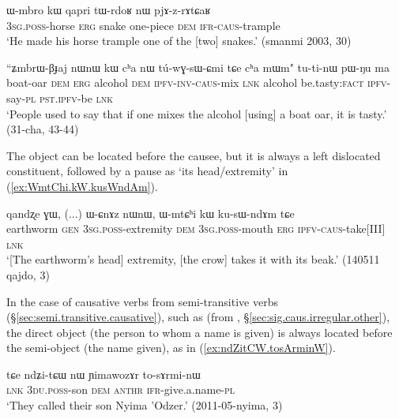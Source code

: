 \begin{exe}
\ex \label{ex:Wmbro.kW.pjAzrAtCaR}
\gll ɯ-mbro kɯ qapri tɯ-rdoʁ nɯ pjɤ-z-rɤtɕaʁ \\
\textsc{3sg}.\textsc{poss}-horse \textsc{erg} snake one-piece \textsc{dem} \textsc{ifr}-\textsc{caus}-trample \\
\glt `He made his horse trample one of the [two] snakes.' (smanmi 2003, 30)
\end{exe}

\begin{exe}
\ex \label{ex:ZmbrWBJaj.kW.tuwGsWCmi}
\gll ``ʑmbrɯ-βɟaj nɯnɯ kɯ cʰa nɯ tú-wɣ-sɯ-ɕmi tɕe cʰa mɯm" tu-ti-nɯ pɯ-ŋu ma \\
boat-oar \textsc{dem} \textsc{erg} alcohol \textsc{dem} \textsc{ipfv}-\textsc{inv}-\textsc{caus}-mix \textsc{lnk} alcohol be.tasty:\textsc{fact} \textsc{ipfv}-say-\textsc{pl} \textsc{pst}.\textsc{ipfv}-be \textsc{lnk} \\
\glt `People used to say that if one mixes the alcohol [using] a boat oar, it is tasty.' (31-cha, 43-44)
\end{exe}

The object can be located before the causee, but it is always a left dislocated constituent, followed by a pause as  `its head/extremity' in (\ref{ex:WmtChi.kW.kusWndAm}).

\begin{exe}
\ex \label{ex:WmtChi.kW.kusWndAm}
\gll  qandʐe ɣɯ, (...) ɯ-ɕnɤz nɯnɯ, ɯ-mtɕʰi kɯ ku-sɯ-ndɤm tɕe \\
earthworm \textsc{gen} {  } \textsc{3sg}.\textsc{poss}-extremity \textsc{dem} \textsc{3sg}.\textsc{poss}-mouth \textsc{erg} \textsc{ipfv}-\textsc{caus}-take[III] \textsc{lnk} \\
\glt `[The earthworm's head] extremity, [the crow] takes it with its beak.' (140511 qajdo, 3)
\end{exe}

In the case of causative verbs from semi-transitive verbs (§\ref{sec:semi.transitive.causative}), such as  (from , §\ref{sec:sig.caus.irregular.other}),  the direct object (the person to whom a name is given) is always located before the semi-object (the name given), as in (\ref{ex:ndZitCW.tosArminW}).

\begin{exe}
\ex \label{ex:ndZitCW.tosArminW}
\gll tɕe ndʑi-tɕɯ nɯ ɲimawozɤr to-sɤrmi-nɯ \\
\textsc{lnk} \textsc{3du}.\textsc{poss}-son \textsc{dem}  \textsc{anthr} \textsc{ifr}-give.a.name-\textsc{pl} \\
\glt `They called their son Nyima 'Odzer.' (2011-05-nyima, 3)
\end{exe}

